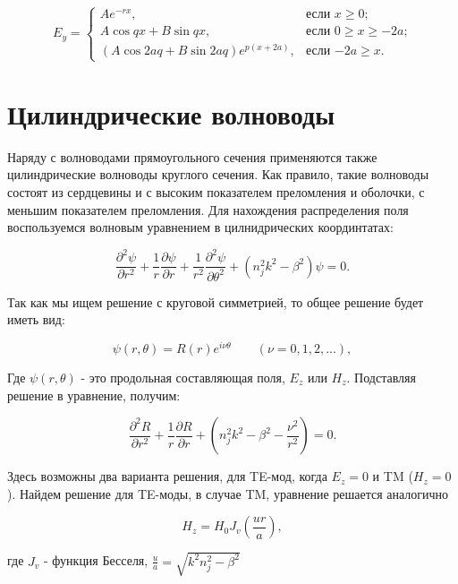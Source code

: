 \begin{equation}
	E_y =
	\begin{cases}
		Ae^{-rx}, &\text{если $x \geqslant 0$;}\\
		A\cos qx + B\sin qx, &\text{если $0 \geqslant x \geqslant -2a $;}\\
		(A\cos 2aq + B\sin 2aq)e^{p(x+2a)}, &\text{если $-2a \geqslant x$.}
	\end{cases}
\end{equation}

\section{Цилиндрические волноводы}
Наряду с волноводами прямоугольного сечения применяются также цилиндрические волноводы круглого сечения. Как правило, такие волноводы состоят из сердцевины и с высоким показателем преломления и оболочки, с меньшим показателем преломления. Для нахождения распределения поля воспользуемся волновым уравнением в цилнидрических координтатах:

\begin{equation}
	\frac{\partial^2\psi}{\partial r^2} + \frac{1}{r}\frac{\partial\psi}{\partial r}+\frac{1}{r^2}\frac{\partial^2\psi}{\partial\theta^2}+(n_j^2 k^2 - \beta^2)\psi = 0.
\end{equation}

Так как мы ищем решение с круговой симметрией, то общее решение будет иметь вид:

\begin{equation}
	\psi(r, \theta) = R(r)e^{i\nu\theta} \qquad (\nu = 0,1,2, ...),
\end{equation}

Где $\psi(r, \theta)$ - это продольная составляющая поля, $E_z$ или $H_z$. Подставляя решение в уравнение, получим:

\begin{equation}
	\frac{\partial^2 R}{\partial r^2} + \frac{1}{r}\frac{\partial R}{\partial r}+(n_j^2 k^2 - \beta^2 - \frac{\nu^2}{r^2}) = 0.
\end{equation}

Здесь возможны два варианта решения, для TE-мод, когда $E_z = 0$ и TM ($H_z = 0$). Найдем решение для TE-моды, в случае TM, уравнение решается аналогично

\begin{equation}
	H_z = H_0 J_v (\frac{ur}{a}),
\end{equation}

где $J_v$ - функция Бесселя, $\frac{u}{a} = \sqrt{k^2 n_j^2 - \beta^2}$